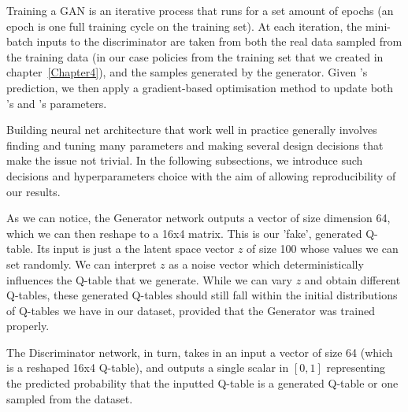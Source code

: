 Training a GAN is an iterative process that runs for a set amount of epochs (an epoch is one full training cycle on the training set).
At each iteration, the mini-batch inputs to the discriminator  are taken from both the real data sampled from the training data (in our case policies from the training set that we created in chapter~\ref{Chapter4}), and the samples generated by the generator.
Given 's prediction, we then apply a gradient-based optimisation method to update both 's and 's parameters.

Building neural net architecture that work well in practice generally involves finding and tuning many parameters and making several design decisions that make the issue not trivial. In the following subsections, we introduce such decisions and hyperparameters choice with the aim of allowing reproducibility of our results.

As we can notice, the Generator network outputs a vector of size dimension 64, which we can then reshape to a 16x4 matrix. This is our 'fake', generated Q-table. Its input is just a the latent space vector $z$ of size 100 whose values we can set randomly. We can interpret $z$ as a noise vector which deterministically influences the Q-table that we generate. While we can vary $z$ and obtain different Q-tables, these generated Q-tables should still fall within the initial distributions of Q-tables we have in our dataset, provided that the Generator was trained properly.

The Discriminator network, in turn, takes in an input a vector of size 64 (which is a reshaped 16x4 Q-table), and outputs a single scalar in $[0,1]$ representing the predicted probability that the inputted Q-table is a generated Q-table or one sampled from the dataset.


